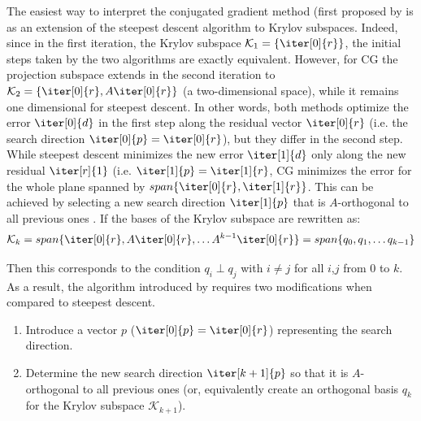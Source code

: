 The easiest way to interpret the conjugated gradient method (first proposed by \cite{hestenes_methods_1952} is as an extension of the steepest descent algorithm to Krylov subspaces. Indeed, since in the first iteration, the Krylov subspace $\mathcal{K}_1=\{\iter[0]{r}\}$, the initial steps taken by the two algorithms are exactly equivalent. However, for CG the projection subspace extends in the second iteration to $\mathcal{K}_2=\{\iter[0]{r}, A\iter[0]{r}\}$ (a two-dimensional space), while it remains one dimensional for steepest descent. In other words, both methods optimize the error $\iter[0]{d}$ in the first step along the residual vector $\iter[0]{r}$ (i.e. the search direction $\iter[0]{p}=\iter[0]{r}$), but they differ in the second step. While steepest descent minimizes the new error $\iter[1]{d}$ only along the new residual $\iter[r]{1}$ (i.e. $\iter[1]{p}=\iter[1]{r}$, CG minimizes the error for the whole plane spanned by $span\{\iter[0]{r}, \iter[1]{r}\}$. This can be achieved by selecting a new search direction $\iter[1]{p}$ that is $A$-orthogonal to all previous ones \cite{trefethen_numerical_1997}. If the bases of the Krylov subspace are rewritten as:
\begin{equation}
    \mathcal{K}_k = span\{\iter[0]{r}, A\iter[0]{r}, \dots A^{k-1}\iter[0]{r}\} = span\{q_0, q_1, \dots q_{k-1}\}
\end{equation}

\noindent Then this corresponds to the condition $q_i \perp q_j$ with $i\neq j$ for all $i$,$j$ from $0$ to $k$. As a result, the algorithm introduced by \cite{hestenes_methods_1952} requires two modifications when compared to steepest descent.
\begin{enumerate}
    \item Introduce a vector $p$ ($\iter[0]{p} = \iter[0]{r}$) representing the search direction.
    \item Determine the new search direction $\iter[k+1]{p}$ so that it is $A$-orthogonal to all previous ones (or, equivalently create an orthogonal basis $q_{k}$ for the Krylov subspace $\mathcal{K}_{k+1}$).
\end{enumerate}

